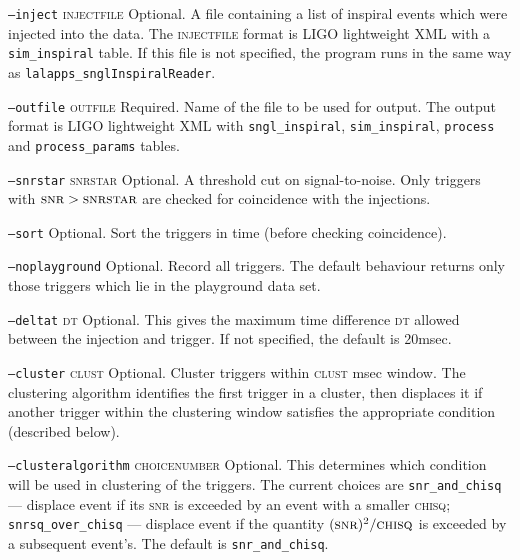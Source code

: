 \begin{entry}
\begin{entry}
\item[\texttt{--inject} \textsc{injectfile}] Optional.  A file
containing a list of inspiral events which were injected into the
data.  The \textsc{injectfile} format is LIGO lightweight XML with a
\texttt{sim\_inspiral} table. If this file is not specified, the
program runs in the same way as \texttt{lalapps\_snglInspiralReader}.

\item[\texttt{--outfile} \textsc{outfile}] Required.  Name of the file
to be used for output.  The output format is LIGO lightweight XML with
\texttt{sngl\_inspiral}, \texttt{sim\_inspiral}, \texttt{process} and 
\texttt{process\_params} tables.  

\item[\texttt{--snrstar} \textsc{snrstar}] Optional.  A threshold cut
on signal-to-noise.  Only triggers with $\textsc{snr} > \textsc{snrstar}$
are checked for coincidence with the injections.

\item[\texttt{--sort}] Optional.   Sort the triggers in time (before
checking coincidence).  

\item[\texttt{--noplayground}] Optional.  Record all triggers.  The
default behaviour returns only those triggers which lie in the
playground data set.  

\item[\texttt{--deltat} \textsc{dt}] Optional.  This gives the maximum time
difference \textsc{dt} allowed between the injection and trigger.  If
not specified, the default is 20msec.  

\item[\texttt{--cluster} \textsc{clust}] Optional.  Cluster triggers
within \textsc{clust} msec window.   The clustering algorithm
identifies the first trigger in a cluster, then displaces it if another 
trigger within the clustering window satisfies the appropriate condition 
(described below).

\item[\texttt{--clusteralgorithm} \textsc{choicenumber}]  Optional.  This
determines which condition will be used in clustering of the triggers.
The current choices are \texttt{snr\_and\_chisq} --- displace event if
its \textsc{snr} is exceeded by an event with a smaller
\textsc{chisq}; \texttt{snrsq\_over\_chisq} --- displace event if the
quantity $(\textsc{snr})^{2}/\textsc{chisq}$ is exceeded by a subsequent
event's.  The default is \texttt{snr\_and\_chisq}.


\end{entry}
\end{entry}
